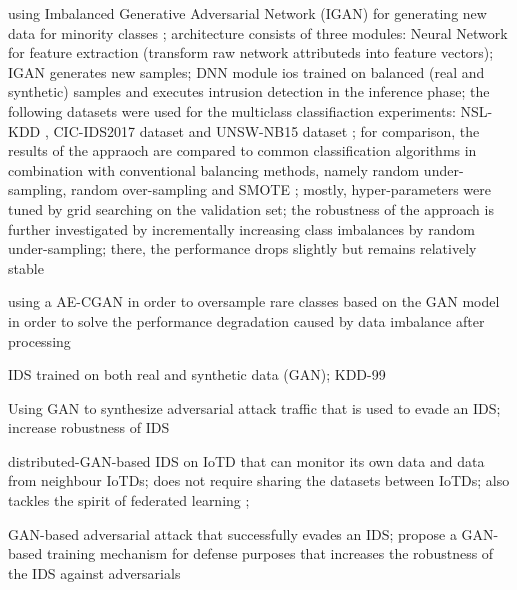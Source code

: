 \documentclass[../../main.tex]{subfiles}
\begin{document}
using Imbalanced Generative Adversarial Network (IGAN) for generating new data for minority classes \cite{huang2020igan}; architecture consists of three modules: Neural Network for feature extraction (transform raw network attributeds into feature vectors); IGAN generates new samples; DNN module ios trained on balanced (real and synthetic) samples and executes intrusion detection in the inference phase; the following datasets were used for the multiclass classifiaction experiments: NSL-KDD \cite{nslkdd}, CIC-IDS2017 dataset \cite{sharafaldin_toward_2018} and UNSW-NB15 dataset \cite{unswnb15}; for comparison, the results of the appraoch are compared to common classification algorithms in combination with conventional balancing methods, namely random under-sampling, random over-sampling and SMOTE \cite{smote}; mostly, hyper-parameters were tuned by grid searching on the validation set; the robustness of the approach is further investigated by incrementally increasing class imbalances by random under-sampling; there, the performance drops slightly but remains relatively stable

using a AE-CGAN in order to oversample rare classes based on the GAN model in order to solve the performance degradation caused by data imbalance after processing\cite{lee2019ae}

IDS trained on both real and synthetic data (GAN); KDD-99 \cite{shahriar2020g}

Using GAN to synthesize adversarial attack traffic that is used to evade an IDS; increase robustness of IDS \cite{lin2022idsgan}

distributed-GAN-based IDS on IoTD that can monitor its own data and data from neighbour IoTDs; does not require sharing the datasets between IoTDs; also tackles the spirit of federated learning \cite{ferdowsi2019generative}; 





GAN-based adversarial attack that successfully evades an IDS; propose a GAN-based training mechanism for defense purposes that increases the robustness of the IDS against adversarials \cite{usama2019generative}




\end{document}
